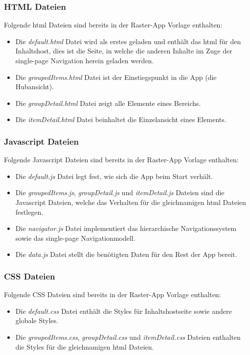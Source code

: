 \documentclass[12pt,a4paper,bibtotoc,abstracton]{scrartcl}
\begin{document}
\subsubsection{HTML Dateien}
\label{subsubsec:htmldateien} 
Folgende \ac{html} Dateien sind bereits in der Raster-App Vorlage enthalten:
\begin{itemize}
	\item Die \textit{default.html} Datei wird als erstes geladen und enthält das \ac{html} für den Inhaltshost, dies ist die Seite, in welche die anderen Inhalte im Zuge der single-page Navigation herein geladen werden.
	\item Die \textit{groupedItems.html} Datei ist der Einstiegspunkt in die App (die Hubansicht).
	\item Die \textit{groupDetail.html} Datei zeigt alle Elemente eines Bereichs.
	\item Die \textit{itemDetail.html} Datei beinhaltet die Einzelansicht eines Elements.
\end{itemize}

\subsubsection{Javascript Dateien}
\label{subsubsec:javascriptdateien} 
Folgende Javascript Dateien sind bereits in der Raster-App Vorlage enthalten:
\begin{itemize}
	\item Die \textit{default.js} Datei legt fest, wie sich die App beim Start verhält.
	\item Die \textit{groupedItems.js}, \textit{groupDetail.js} und \textit{itemDetail.js} Dateien sind die Javascript Dateien, welche das Verhalten für die gleichnamigen \ac{html} Dateien festlegen.
	\item Die \textit{navigator.js} Datei implementiert das hierarchische Navigationssystem sowie das single-page Navigationmodell.
	\item Die \textit{data.js} Datei stellt die benötigten Daten für den Rest der App bereit.
\end{itemize}

\subsubsection{CSS Dateien}
\label{subsubsec:cssdateien} 
Folgende CSS Dateien sind bereits in der Raster-App Vorlage enthalten:
\begin{itemize}
	\item Die \textit{default.css} Datei enthält die Styles für Inhaltshostseite sowie andere globale Styles.
	\item Die \textit{groupedItems.css}, \textit{groupDetail.css} und \textit{itemDetail.css} Dateien enthalten die Styles für die gleichnamigen \ac{html} Dateien.
\end{itemize}
\end{document}
